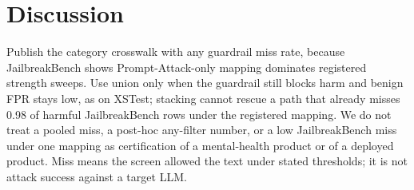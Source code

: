 \section{Discussion}
\label{sec:discussion}

Publish the category crosswalk with any guardrail miss rate, because JailbreakBench shows Prompt-Attack-only mapping dominates registered strength sweeps.
Use union only when the guardrail still blocks harm and benign FPR stays low, as on XSTest; stacking cannot rescue a path that already misses 0.98 of harmful JailbreakBench rows under the registered mapping.
We do not treat a pooled miss, a post-hoc any-filter number, or a low JailbreakBench miss under one mapping as certification of a mental-health product or of a deployed product.
Miss means the screen allowed the text under stated thresholds; it is not attack success against a target LLM.
